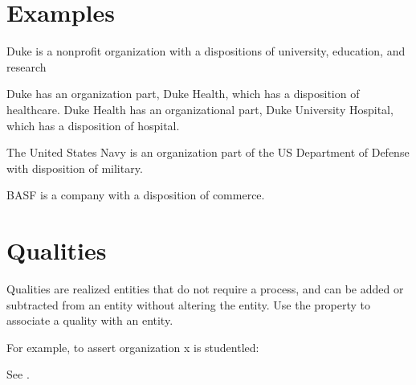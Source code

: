 \documentclass[letterpaper,10pt,english]{sphinxmanual}
\begin{document}
\section{Examples}
\label{\detokenize{organizations:examples}}
\begin{sphinxShadowBox}

\sphinxAtStartPar
Duke is a nonprofit organization
with a dispositions of university, education, and research

\sphinxAtStartPar
Duke has an organization part, Duke Health, which has a disposition of
healthcare.  Duke Health has an organizational part, Duke University Hospital,
which has a disposition of hospital.
\end{sphinxShadowBox}

\begin{sphinxShadowBox}

\sphinxAtStartPar
The United States Navy is an organization part of the US Department of Defense
with disposition of military.
\end{sphinxShadowBox}

\begin{sphinxShadowBox}

\sphinxAtStartPar
BASF is a company with a disposition of commerce.
\end{sphinxShadowBox}


\section{Qualities}
\label{\detokenize{organizations:qualities}}
\sphinxAtStartPar
Qualities are realized entities that do not require a process, and can be added or
subtracted from an entity without altering the entity.  Use the {\hyperref[\detokenize{doc-RO_0000086::doc}]{}} property to associate a quality with an entity.

\sphinxAtStartPar
For example, to assert organization x is student\sphinxhyphen{}led:

\begin{sphinxVerbatim}[commandchars=\\\{\}]
  
  
\end{sphinxVerbatim}

\sphinxAtStartPar
See {\hyperref[\detokenize{organizations:table-3}]{}}.
\end{document}

